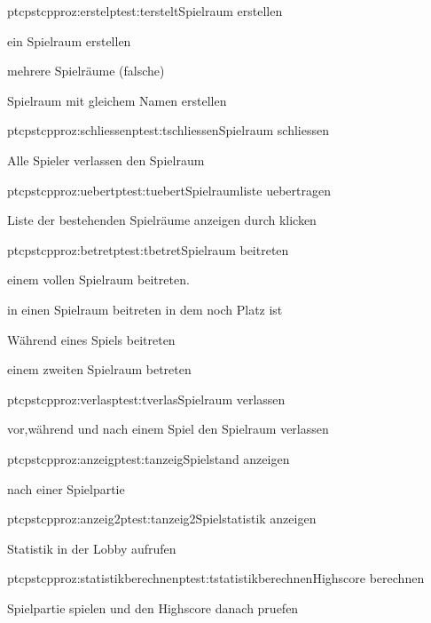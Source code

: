 \begin{description}[leftmargin=3em, style=sameline]
	\begin{pftp}{ptc}{pstc}{pproz:erstel}{ptest:terstelt}{Spielraum erstellen}
		\item	ein Spielraum erstellen	
		\item	mehrere Spielräume (falsche)
		\item   Spielraum mit gleichem Namen erstellen
	\end{pftp}

	\begin{pftp}{ptc}{pstc}{pproz:schliessen}{ptest:tschliessen}{Spielraum schliessen}
		\item  Alle Spieler verlassen den Spielraum
	\end{pftp}

	\begin{pftp}{ptc}{pstc}{pproz:uebert}{ptest:tuebert}{Spielraumliste 	uebertragen}
		\item	Liste der bestehenden Spielräume anzeigen durch klicken	
	\end{pftp}
		
	\begin{pftp}{ptc}{pstc}{pproz:betret}{ptest:tbetret}{Spielraum beitreten}
		\item einem vollen Spielraum beitreten.
		\item in einen Spielraum beitreten in dem noch Platz ist
		\item Während eines Spiels beitreten 
		\item einem zweiten Spielraum betreten 
	\end{pftp}
		
	\begin{pftp}{ptc}{pstc}{pproz:verlas}{ptest:tverlas}{Spielraum verlassen}
		\item	vor,während und nach einem Spiel den Spielraum verlassen 
	\end{pftp}

	\begin{pftp}{ptc}{pstc}{pproz:anzeig}{ptest:tanzeig}{Spielstand anzeigen}
		\item	nach einer Spielpartie
	\end{pftp}
		
	\begin{pftp}{ptc}{pstc}{pproz:anzeig2}{ptest:tanzeig2}{Spielstatistik anzeigen}
		\item	Statistik in der Lobby aufrufen
	\end{pftp}
		
	\begin{pftp}{ptc}{pstc}{pproz:statistikberechnen}{ptest:tstatistikberechnen}{Highscore berechnen}
		\item	Spielpartie spielen und den Highscore danach pruefen
	\end{pftp}
		

\end{description}
